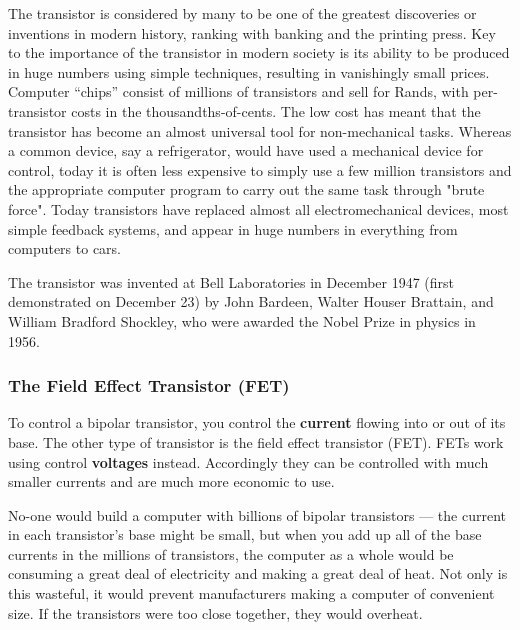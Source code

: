 \begin{IFact}{The transistor is considered by many to be one of the greatest discoveries or inventions in modern history, ranking with banking and the printing press. Key to the importance of the transistor in modern society is its ability to be produced in huge numbers using simple techniques, resulting in vanishingly small prices. Computer ``chips'' consist of millions of transistors and sell for Rands, with per-transistor costs in the thousandths-of-cents. The low cost has meant that the transistor has become an almost universal tool for non-mechanical tasks. Whereas a common device, say a refrigerator, would have used a mechanical device for control, today it is often less expensive to simply use a few million transistors and the appropriate computer program to carry out the same task through "brute force". Today transistors have replaced almost all electromechanical devices, most simple feedback systems, and appear in huge numbers in everything from computers to cars.}\end{IFact} 

\begin{IFact}{The transistor was invented at Bell Laboratories in December 1947 (first demonstrated on December 23) by John Bardeen, Walter Houser Brattain, and William Bradford Shockley, who were awarded the Nobel Prize in physics in 1956.}\end{IFact}

\subsubsection{The Field Effect Transistor (FET)}

To control a bipolar transistor, you control the {\bf current} flowing into or out of its base.  The other type of transistor is the field effect transistor (FET).  FETs work using control {\bf voltages} instead.  Accordingly they can be controlled with much smaller currents and are much more economic to use.  

\begin{IFact}{No-one would build a computer with billions of bipolar transistors --- the current in each transistor's base might be small, but when you add up all of the base currents in the millions of transistors, the computer as a whole would be consuming a great deal of electricity and making a great deal of heat.  Not only is this wasteful, it would prevent manufacturers making a computer of convenient size.  If the transistors were too close together, they would overheat.}\end{IFact}

